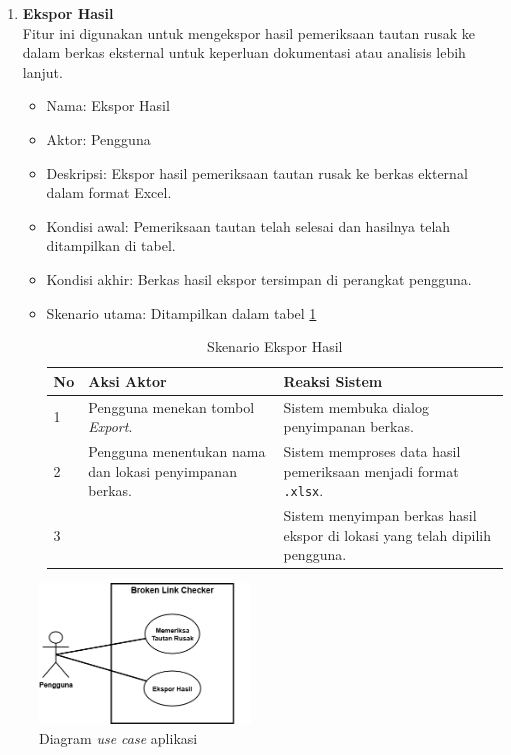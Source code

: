 \begin{enumerate}
    \item \textbf{Ekspor Hasil}\\
    Fitur ini digunakan untuk mengekspor hasil pemeriksaan tautan rusak ke dalam berkas eksternal untuk keperluan dokumentasi atau analisis lebih lanjut.
    \begin{itemize}
        \item Nama: Ekspor Hasil
        \item Aktor: Pengguna
        \item Deskripsi: Ekspor hasil pemeriksaan tautan rusak ke berkas ekternal dalam format Excel.
        \item Kondisi awal: Pemeriksaan tautan telah selesai dan hasilnya telah ditampilkan di tabel.
        \item Kondisi akhir: Berkas hasil ekspor tersimpan di perangkat pengguna.
        \item Skenario utama: Ditampilkan dalam tabel \ref{tab:skenario-02}
        \begin{table}[h]
            \centering
            \caption{Skenario Ekspor Hasil}
            \vspace{6pt}
            \begin{tabular}{|p{0.5cm} |p{6cm}| p{6cm}|}\hline
                No & Aksi Aktor & Reaksi Sistem \\ \hline
                1 & Pengguna menekan tombol \textit{Export}. & Sistem membuka dialog penyimpanan berkas. \\ \hline
                2 & Pengguna menentukan nama dan lokasi penyimpanan berkas. & Sistem memproses data hasil pemeriksaan menjadi format \texttt{.xlsx}. \\ \hline
                3 & & Sistem menyimpan berkas hasil ekspor di lokasi yang telah dipilih pengguna. \\ \hline
            \end{tabular}
            \label{tab:skenario-02}
        \end{table}
    \end{itemize}
\end{enumerate}

\begin{figure}[H]
    \centering
    \includegraphics[width=0.5\textwidth]{Gambar/030301-use-case-diagram.png}
    \caption{Diagram \textit{use case} aplikasi}
    \label{fig:use-case-diagram}
\end{figure}

